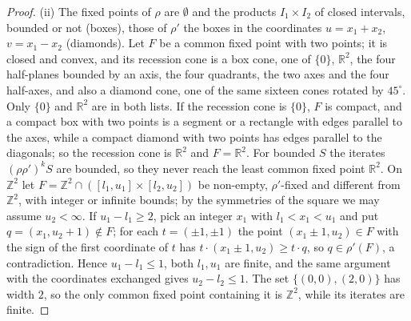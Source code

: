 \documentclass[11pt]{amsart}
\theoremstyle{definition}
\begin{document}
\begin{proof}
(ii) The fixed points of $\rho$ are $\emptyset$ and the products
$I_1\times I_2$ of closed intervals, bounded or not (boxes), those of
$\rho'$ the boxes in the coordinates $u=x_1+x_2$, $v=x_1-x_2$
(diamonds). Let $F$ be a common fixed point with two points; it is
closed and convex, and its recession cone is a box cone, one of $\{0\}$,
$\mathbb R^2$, the four half-planes bounded by an axis, the four
quadrants, the two axes and the four half-axes, and also a diamond cone,
one of the same sixteen cones rotated by $45^\circ$. Only $\{0\}$ and
$\mathbb R^2$ are in both lists. If the recession cone is $\{0\}$, $F$ is
compact, and a compact box with two points is a segment or a rectangle
with edges parallel to the axes, while a compact diamond with two points
has edges parallel to the diagonals; so the recession cone is $\mathbb
R^2$ and $F=\mathbb R^2$. For bounded $S$ the iterates $(\rho\rho')^kS$
are bounded, so they never reach the least common fixed point $\mathbb
R^2$. On $\mathbb Z^2$ let $F=\mathbb Z^2\cap([l_1,u_1]\times[l_2,u_2])$
be non-empty, $\rho'$-fixed and different from $\mathbb Z^2$, with
integer or infinite bounds; by the symmetries of the square we may
assume $u_2<\infty$. If $u_1-l_1\ge2$, pick an integer $x_1$ with
$l_1<x_1<u_1$ and put $q=(x_1,u_2+1)\notin F$; for each $t=(\pm1,\pm1)$
the point $(x_1\pm1,u_2)\in F$ with the sign of the first coordinate of
$t$ has $t\cdot(x_1\pm1,u_2)\ge t\cdot q$, so $q\in\rho'(F)$, a
contradiction. Hence $u_1-l_1\le1$, both $l_1,u_1$ are finite, and the
same argument with the coordinates exchanged gives $u_2-l_2\le1$. The
set $\{(0,0),(2,0)\}$ has width $2$, so the only common fixed point
containing it is $\mathbb Z^2$, while its iterates are finite.


\end{proof}
\end{document}

